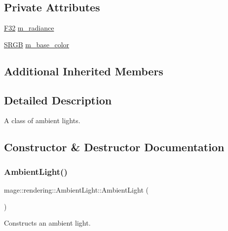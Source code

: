 \subsection*{Private Attributes}
\begin{DoxyCompactItemize}
\item 
\hyperlink{namespacemage_aa97e833b45f06d60a0a9c4fc22ae02c0}{F32} \hyperlink{classmage_1_1rendering_1_1_ambient_light_adfdafe01958a72df46eeb3c0f5f0d0c4}{m\+\_\+radiance}
\item 
\hyperlink{structmage_1_1_s_r_g_b}{S\+R\+GB} \hyperlink{classmage_1_1rendering_1_1_ambient_light_a9b6bf87dbc6f12644b5ace67f03aa883}{m\+\_\+base\+\_\+color}
\end{DoxyCompactItemize}
\subsection*{Additional Inherited Members}


\subsection{Detailed Description}
A class of ambient lights. 

\subsection{Constructor \& Destructor Documentation}
\hypertarget{classmage_1_1rendering_1_1_ambient_light_a178327bf02552f65b98ad3858416a81d}{}\label{classmage_1_1rendering_1_1_ambient_light_a178327bf02552f65b98ad3858416a81d} 
\subsubsection{\texorpdfstring{Ambient\+Light()}{AmbientLight()}\hspace{0.1cm}{\footnotesize\ttfamily [1/3]}}
{\footnotesize\ttfamily mage\+::rendering\+::\+Ambient\+Light\+::\+Ambient\+Light (\begin{DoxyParamCaption}{ }\end{DoxyParamCaption})\hspace{0.3cm}{\ttfamily [noexcept]}}

Constructs an ambient light. \hypertarget{classmage_1_1rendering_1_1_ambient_light_a363ca4f79eef6f0a95a2e3d381479af1}{}\label{classmage_1_1rendering_1_1_ambient_light_a363ca4f79eef6f0a95a2e3d381479af1} 
